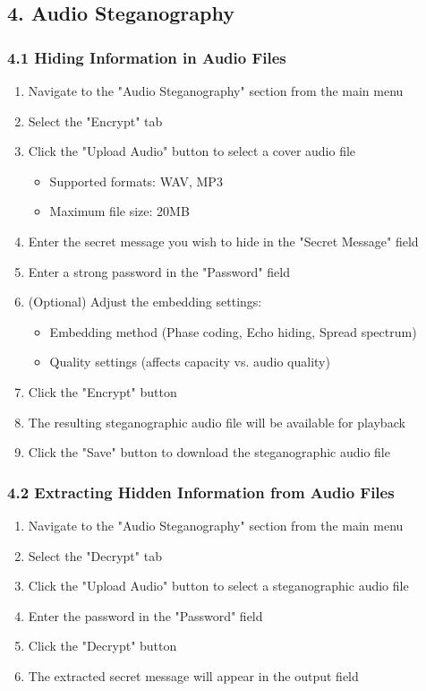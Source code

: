 \documentclass[12pt, a4paper, oneside]{book}
\begin{document}
\subsection*{4. Audio Steganography}

\subsubsection*{4.1 Hiding Information in Audio Files}

\begin{enumerate}
    \item Navigate to the "Audio Steganography" section from the main menu
    \item Select the "Encrypt" tab
    \item Click the "Upload Audio" button to select a cover audio file
    \begin{itemize}
        \item Supported formats: WAV, MP3
        \item Maximum file size: 20MB
    \end{itemize}
    \item Enter the secret message you wish to hide in the "Secret Message" field
    \item Enter a strong password in the "Password" field
    \item (Optional) Adjust the embedding settings:
    \begin{itemize}
        \item Embedding method (Phase coding, Echo hiding, Spread spectrum)
        \item Quality settings (affects capacity vs. audio quality)
    \end{itemize}
    \item Click the "Encrypt" button
    \item The resulting steganographic audio file will be available for playback
    \item Click the "Save" button to download the steganographic audio file
\end{enumerate}

\subsubsection*{4.2 Extracting Hidden Information from Audio Files}

\begin{enumerate}
    \item Navigate to the "Audio Steganography" section from the main menu
    \item Select the "Decrypt" tab
    \item Click the "Upload Audio" button to select a steganographic audio file
    \item Enter the password in the "Password" field
    \item Click the "Decrypt" button
    \item The extracted secret message will appear in the output field
\end{enumerate}
\end{document}
